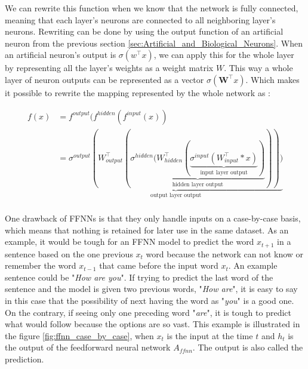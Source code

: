 We can rewrite this function when we know that the network is fully connected, meaning that each layer's neurons are connected to all neighboring layer's neurons. Rewriting can be done by using the output function of an artificial neuron from the previous section \ref{sec:Artificial_and_Biological_Neurons}. When an artificial neuron's output is $\sigma(w^\top x)$, we can apply this for the whole layer by representing all the layer's weights as a weight matrix $W$. This way a whole layer of neuron outputs can be represented as a vector $\sigma(\mathbf{W}^\top x)$. Which makes it possible to rewrite the mapping represented by the whole network as \parencite{goodfellow2016deep}:

\begin{equation}
    \begin{aligned}
        f(x) &= f^{output} (f^{hidden}(f^{input}(x)) \\
        &= \underbrace{\sigma^{output} ( W_{output}^\top (\underbrace{\sigma^{hidden}(W_{hidden}^\top(\underbrace{\sigma^{input}(W_{input}^\top * x )}_\text{input\ layer\ output})}_\text{hidden\ layer\ output})))}_\text{output\ layer\ output} \\
    \end{aligned}
\end{equation}

One drawback of FFNNs is that they only handle inputs on a case-by-case basis, which means that nothing is retained for later use in the same dataset. As an example, it would be tough for an FFNN model to predict the word $x_{t+1}$ in a sentence based on the one previous $x_t$ word because the network can not know or remember the word $x_{t-1}$ that came before the input word $x_t$. An example sentence could be "\emph{How are you}". If trying to predict the last word of the sentence and the model is given two previous words, "\emph{How are}", it is easy to say in this case that the possibility of next having the word as "\emph{you}" is a good one. On the contrary, if seeing only one preceding word "\emph{are}", it is tough to predict what would follow because the options are so vast. This example is illustrated in the figure \ref{fig:ffnn_case_by_case}, when $x_t$ is the input at the time $t$ and $h_t$ is the output of the feedforward neural network $A_{ffnn}$. The output is also called the prediction.


